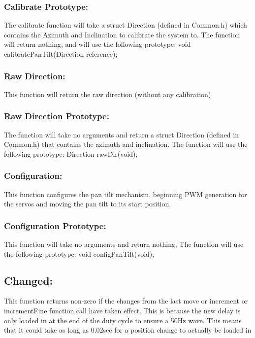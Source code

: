 \documentclass[]{article}
\begin{document}
\subsubsection{Calibrate Prototype:}
The calibrate function will take a struct Direction (defined in Common.h) which contains the Azimuth and Inclination to calibrate the system to. The function will return nothing, and will use the following prototype: \newline \newline
void calibratePanTilt(Direction reference);

\subsubsection{Raw Direction:}
This function will return the raw direction (without any calibration)

\subsubsection{Raw Direction Prototype:}
The function will take no arguments and return a struct Direction (defined in Common.h) that contains the azimuth and inclination. The function will use the following prototype: \newline \newline
Direction rawDir(void);

\subsubsection{Configuration:}
This function configures the pan tilt mechanism, beginning PWM generation for the servos and moving the pan tilt to its start position.

\subsubsection{Configuration Prototype:}
This function will take no arguments and return nothing. The function will use the following prototype: \newline \newline
void configPanTilt(void);

\subsection{Changed:}
This function returns non-zero if the changes from the last move or increment or incrementFine function call have taken effect. This is because the new delay is only loaded in at the end of the duty cycle to ensure a 50Hz wave. This means that it could take as long as 0.02sec for a position change to actually be loaded in 
\end{document}
